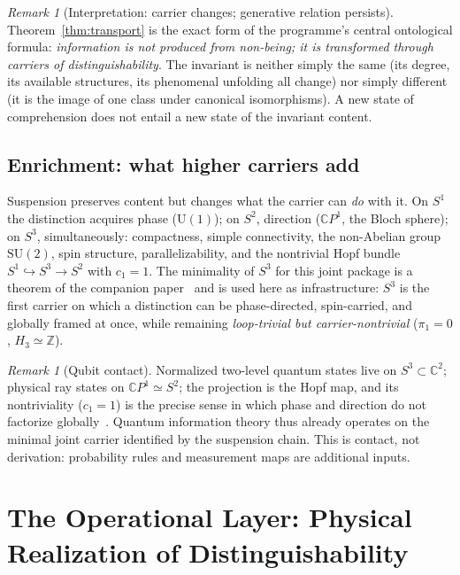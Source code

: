 \documentclass[11pt,a4paper]{article}
\theoremstyle{definition}
\theoremstyle{remark}
\newtheorem{remark}[theorem]{Remark}
\newcommand{\Sone}{S^{1}}
\newcommand{\Stwo}{S^{2}}
\newcommand{\Sthree}{S^{3}}
\newcommand{\C}{\mathbb{C}}
\newcommand{\Z}{\mathbb{Z}}
\newcommand{\CP}{\mathbb{C}P}
\newcommand{\SU}{\mathrm{SU}}
\newcommand{\U}{\mathrm{U}}
\begin{document}
\begin{remark}[Interpretation: carrier changes; generative relation persists]
Theorem~\ref{thm:transport} is the exact form of the programme's central ontological formula:
\emph{information is not produced from non-being; it is transformed through carriers of
distinguishability}.  The invariant is neither simply the same (its degree, its available
structures, its phenomenal unfolding all change) nor simply different (it is the image of one
class under canonical isomorphisms).  A new state of comprehension does not entail a new state
of the invariant content.
\end{remark}

\subsection{Enrichment: what higher carriers add}

Suspension preserves content but changes what the carrier can \emph{do} with it.  On $\Sone$ the
distinction acquires phase ($\U(1)$); on $\Stwo$, direction ($\CP^{1}$, the Bloch sphere); on
$\Sthree$, simultaneously: compactness, simple connectivity, the non-Abelian group $\SU(2)$,
spin structure, parallelizability, and the nontrivial Hopf bundle
$\Sone\hookrightarrow\Sthree\to\Stwo$ with $c_{1}=1$.  The minimality of $\Sthree$ for this
joint package is a theorem of the companion paper~\cite{PB2026susp} and is used here as
infrastructure: $\Sthree$ is the first carrier on which a distinction can be phase-directed,
spin-carried, and globally framed at once, while remaining \emph{loop-trivial but
carrier-nontrivial} ($\pi_{1}=0$, $H_{3}\simeq\Z$).

\begin{remark}[Qubit contact]
Normalized two-level quantum states live on $\Sthree\subset\C^{2}$; physical ray states on
$\CP^{1}\simeq\Stwo$; the projection is the Hopf map, and its nontriviality ($c_{1}=1$) is the
precise sense in which phase and direction do not factorize
globally~\cite{PB2026susp}.  Quantum information theory thus already operates on the minimal
joint carrier identified by the suspension chain.  This is contact, not derivation: probability
rules and measurement maps are additional inputs.
\end{remark}

\section{The Operational Layer: Physical Realization of Distinguishability}
\label{sec:physical}
\end{document}
